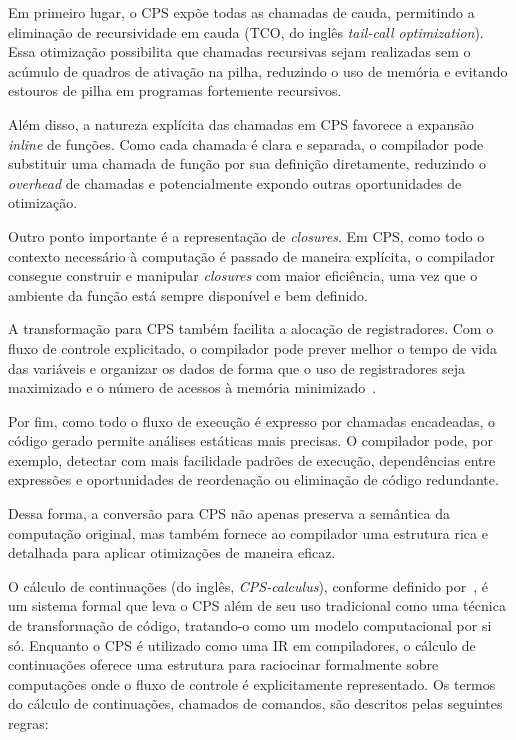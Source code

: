 Em primeiro lugar, o CPS expõe todas as chamadas de cauda, permitindo a eliminação de recursividade em cauda (TCO, do inglês \textit{tail-call optimization}).
Essa otimização possibilita que chamadas recursivas sejam realizadas sem o acúmulo de quadros de ativação na pilha, reduzindo o uso de memória e evitando estouros de pilha em programas fortemente recursivos.

Além disso, a natureza explícita das chamadas em CPS favorece a expansão \textit{inline} de funções.
Como cada chamada é clara e separada, o compilador pode substituir uma chamada de função por sua definição diretamente, reduzindo o \textit{overhead} de chamadas e potencialmente expondo outras oportunidades de otimização.

Outro ponto importante é a representação de \textit{closures}.
Em CPS, como todo o contexto necessário à computação é passado de maneira explícita, o compilador consegue construir e manipular \textit{closures} com maior eficiência, uma vez que o ambiente da função está sempre disponível e bem definido.

A transformação para CPS também facilita a alocação de registradores.
Com o fluxo de controle explicitado, o compilador pode prever melhor o tempo de vida das variáveis e organizar os dados de forma que o uso de registradores seja maximizado e o número de acessos à memória minimizado~\cite{appel1992compiling}.

Por fim, como todo o fluxo de execução é expresso por chamadas encadeadas, o código gerado permite análises estáticas mais precisas.
O compilador pode, por exemplo, detectar com mais facilidade padrões de execução, dependências entre expressões e oportunidades de reordenação ou eliminação de código redundante.

Dessa forma, a conversão para CPS não apenas preserva a semântica da computação original, mas também fornece ao compilador uma estrutura rica e detalhada para aplicar otimizações de maneira eficaz.

O cálculo de continuações (do inglês, \textit{CPS-calculus}), conforme definido por~, é um sistema formal que leva o CPS além de seu uso tradicional como uma técnica de transformação de código, tratando-o como um modelo computacional por si só.
Enquanto o CPS é utilizado como uma IR em compiladores, o cálculo de continuações oferece uma estrutura para raciocinar formalmente sobre computações onde o fluxo de controle é explicitamente representado.
Os termos do cálculo de continuações, chamados de comandos, são descritos pelas seguintes regras:

